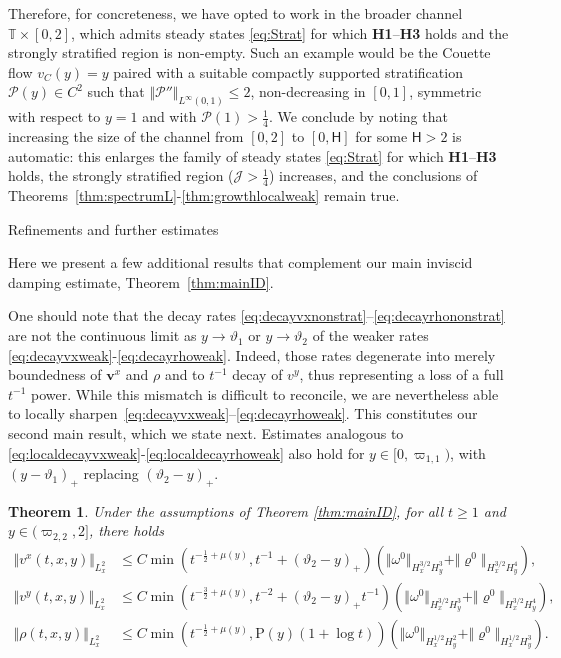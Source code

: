 \documentclass[11pt,reqno]{amsproc}
\makeatletter
\renewcommand\subsection{\@startsection{subsection}{2}%
\normalparindent{.5\linespacing\@plus.7\linespacing}{-.5em}
{\normalfont\bfseries}}
\newcounter{bigthm}
\newtheorem{bigtheorem}[bigthm]{Theorem}
\theoremstyle{definition}
\numberwithin{equation}{section}
\newcommand{\cJ}{{\mathcal{J}}}
\newcommand{\T}{{\mathbb T}}
\renewcommand{\v}{\boldsymbol{v}}
\renewcommand{\P}{{\mathcal{P}}}
\makeatother
\begin{document}
{Therefore, for concreteness, we have opted to work in the broader channel $\T\times[0,2]$, which admits steady states \eqref{eq:Strat} for which \textbf{H1}--\textbf{H3} holds and the strongly stratified region is non-empty. Such an example would be the Couette flow $v_C(y) =y$ paired with a suitable compactly supported stratification $\P(y)\in C^2$ such that $\Vert \P''\Vert_{L^\infty(0,1)}\leq 2$, non-decreasing in $[0,1]$, symmetric with respect to $y=1$ and with $\P(1)>\frac14$. We conclude by noting that increasing the size of the channel from $[0,2]$ to $[0,\mathsf{H}]$ for some $\mathsf{H}>2$ is automatic: this enlarges the family of steady states \eqref{eq:Strat} for which \textbf{H1}--\textbf{H3} holds, the strongly stratified region ($\cJ>\frac14$) increases, and the conclusions of Theorems~\ref{thm:spectrumL}-\ref{thm:growthlocalweak} remain true.  }

\subsection{Refinements and further estimates} 

Here we present a few additional results that complement our main inviscid damping estimate, Theorem~\ref{thm:mainID}.


One should note that the decay rates \eqref{eq:decayvxnonstrat}--\eqref{eq:decayrhononstrat} are not the continuous limit as $y\rightarrow \vartheta_1$ or $y\rightarrow \vartheta_2$ of the weaker rates \eqref{eq:decayvxweak}-\eqref{eq:decayrhoweak}. Indeed, those rates degenerate into merely boundedness of $\v^x$ and $\rho$ and to $t^{-1}$ decay of $v^y$, thus representing a loss of a full $t^{-1}$ power. While this mismatch is difficult to reconcile, we are nevertheless able to locally sharpen~\eqref{eq:decayvxweak}–\eqref{eq:decayrhoweak}. This constitutes our second main result, which we state next. Estimates analogous to \eqref{eq:localdecayvxweak}-\eqref{eq:localdecayrhoweak} also hold for $y\in [0,\varpi_{1,1})$, with  $(y-\vartheta_1)_+$ replacing $(\vartheta_2-y)_+$. 

\begin{bigtheorem}\label{thm:IDlocalweak}
Under the assumptions of Theorem \ref{thm:mainID}, for all $t\geq1$ and $y\in  (\varpi_{2,2}, 2]$,  there holds
\begin{align}
\Vert v^x(t,x,y) \Vert_{L^2_x}  & \leq C \min \left( t^{-\frac12+\mu(y)}, t^{-1} + (\vartheta_2 - y)_+ \right) \left(  \Vert \omega^0 \Vert_{H^{3/2}_x H^3_y} + \Vert \varrho^0 \Vert_{H^{3/2}_x H^4_y}\right), \label{eq:localdecayvxweak} \\
\Vert v^y(t,x,y) \Vert_{L^2_x}  &\leq C \min \left( t^{-\frac32+\mu(y)}, t^{-2} + (\vartheta_2 - y)_+t^{-1} \right) \left(  \Vert \omega^0 \Vert_{H^{3/2}_x H^3_y} + \Vert \varrho^0 \Vert_{H^{3/2}_x H^4_y}\right),\label{eq:localdecayvyweak}\\
\Vert \rho(t,x,y) \Vert_{L^2_x} &\leq C  \min \left( t^{-\frac12+\mu(y)}, \mathrm{P}(y)(1+\log t) \right) \left(  \Vert \omega^0 \Vert_{H^{1/2}_x H^2_y} + \Vert \varrho^0 \Vert_{H^{1/2}_x H^3_y}\right). \label{eq:localdecayrhoweak} 
\end{align}
\end{bigtheorem}
\end{document}
